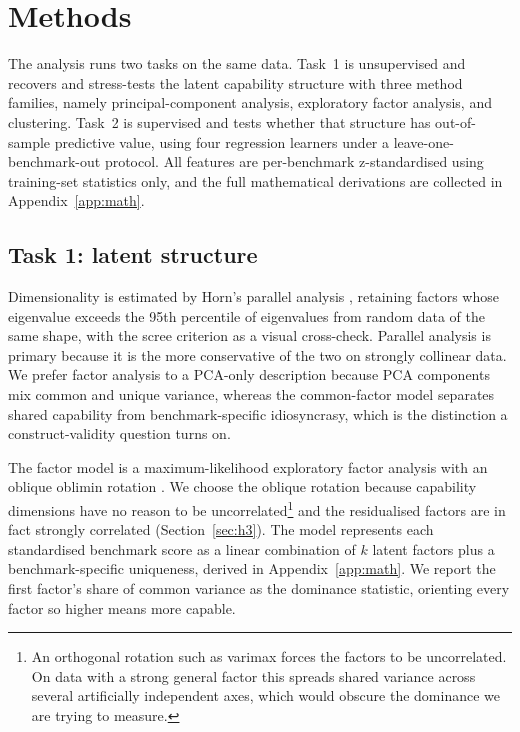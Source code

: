 \section{Methods}\label{sec:methods}
The analysis runs two tasks on the same data. Task~1 is unsupervised and recovers and stress-tests the
latent capability structure with three method families, namely principal-component analysis, exploratory
factor analysis, and clustering. Task~2 is supervised and tests whether that structure has out-of-sample
predictive value, using four regression learners under a leave-one-benchmark-out protocol. All features
are per-benchmark z-standardised using training-set statistics only, and the full mathematical
derivations are collected in Appendix~\ref{app:math}.

\subsection{Task 1: latent structure}\label{sec:task1}
Dimensionality is estimated by Horn's parallel analysis \cite{horn1965}, retaining factors whose
eigenvalue exceeds the 95th percentile of eigenvalues from random data of the same shape, with the scree
criterion \cite{cattell1966} as a visual cross-check. Parallel analysis is primary because it is the
more conservative of the two on strongly collinear data. We prefer factor analysis to a PCA-only
description because PCA components mix common and unique variance, whereas the common-factor model
separates shared capability from benchmark-specific idiosyncrasy, which is the distinction a
construct-validity question turns on.

The factor model is a maximum-likelihood exploratory factor analysis with an oblique oblimin rotation
\cite{thurstone1947}. We choose the oblique rotation because capability dimensions have no reason to
be uncorrelated\footnote{An orthogonal rotation such as varimax forces the factors to be uncorrelated. On data with a strong general factor this spreads shared variance across several artificially independent axes, which would obscure the dominance we are trying to measure.} and the residualised factors are in fact strongly correlated (Section~\ref{sec:h3}). The model represents each standardised benchmark score as a linear combination of $k$ latent factors plus a benchmark-specific uniqueness, derived in Appendix~\ref{app:math}. We report the first factor's
share of common variance as the dominance statistic, orienting every factor so higher means more
capable.

